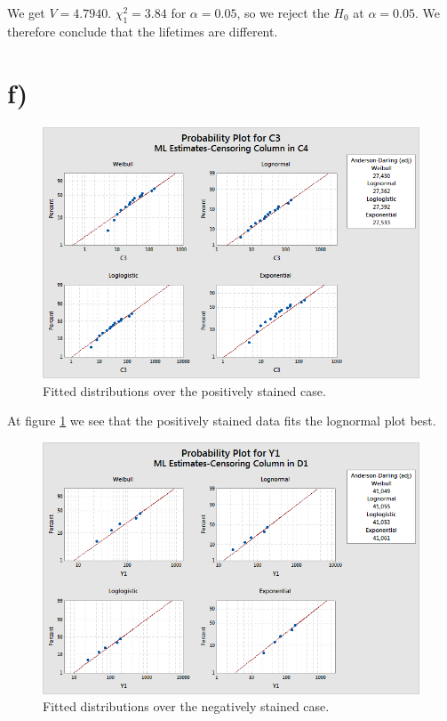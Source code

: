 \documentclass[10pt, a4paper]{article}
\begin{document}
We get $V = 4.7940 $. $\chi^2_1=3.84$ for $\alpha = 0.05$, so we reject the $H_0$ at $ \alpha = 0.05 $. We therefore conclude that the lifetimes are different.

\section*{f)}

\begin{center}
\begin{figure}[h!]
\centering
\includegraphics[scale=0.75]{pos.png}
\caption{Fitted distributions over the positively stained case.}
\label{pos}
\end{figure}
\end{center}
At figure \ref{pos} we see that the positively stained data fits the lognormal plot best. 



\begin{center}
\begin{figure}[h!]
\centering
\includegraphics[scale=0.75]{neg.png}
\caption{Fitted distributions over the negatively stained case.}
\label{neg}
\end{figure}
\end{center}
\end{document}
